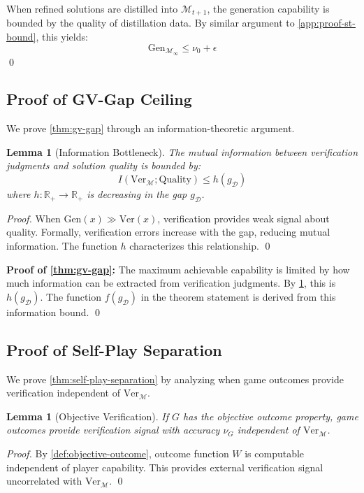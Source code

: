 \documentclass{article}
\newtheorem{lemma}[theorem]{Lemma}
\theoremstyle{definition}
\theoremstyle{remark}
\newcommand{\M}{\mathcal{M}}  %
\newcommand{\D}{\mathcal{D}}  %
\newcommand{\Gen}{\text{Gen}}  %
\newcommand{\Ver}{\text{Ver}}  %
\newcommand{\R}{\mathbb{R}}    %
\begin{document}
When refined solutions are distilled into \(\M_{t+1}\), the generation capability is bounded by the quality of distillation data. By similar argument to \cref{app:proof-st-bound}, this yields:
\[
\Gen_{\M_\infty} \leq \nu_0 + \epsilon
\]
\qed

\subsection{Proof of GV-Gap Ceiling}
\label{app:proof-gv-gap}

We prove \cref{thm:gv-gap} through an information-theoretic argument.

\begin{lemma}[Information Bottleneck]
\label{lem:info-bottleneck}
The mutual information between verification judgments and solution quality is bounded by:
\[
I(\Ver_\M ; \text{Quality}) \leq h(g_\D)
\]
where \(h : \R_+ \to \R_+\) is decreasing in the gap \(g_\D\).
\end{lemma}

\begin{proof}
When \(\Gen(x) \gg \Ver(x)\), verification provides weak signal about quality. Formally, verification errors increase with the gap, reducing mutual information. The function \(h\) characterizes this relationship. \qed
\end{proof}

\noindent\textbf{Proof of \cref{thm:gv-gap}:}
The maximum achievable capability is limited by how much information can be extracted from verification judgments. By \cref{lem:info-bottleneck}, this is \(h(g_\D)\). The function \(f(g_\D)\) in the theorem statement is derived from this information bound. \qed

\subsection{Proof of Self-Play Separation}
\label{app:proof-selfplay}

We prove \cref{thm:self-play-separation} by analyzing when game outcomes provide verification independent of \(\Ver_\M\).

\begin{lemma}[Objective Verification]
\label{lem:objective-verification}
If \(G\) has the objective outcome property, game outcomes provide verification signal with accuracy \(\nu_G\) independent of \(\Ver_\M\).
\end{lemma}

\begin{proof}
By \cref{def:objective-outcome}, outcome function \(W\) is computable independent of player capability. This provides external verification signal uncorrelated with \(\Ver_\M\). \qed
\end{proof}
\end{document}
